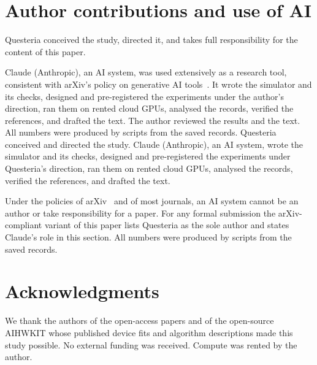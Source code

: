 \begin{sloppypar}
\end{sloppypar}

\section*{Author contributions and use of AI}
\ifdefined\arxivvariant
Questeria conceived the study, directed it, and takes full responsibility for the content of this paper.

Claude (Anthropic), an AI system, was used extensively as a research tool, consistent with arXiv's policy on generative AI
tools~\cite{arxiv_policy}. It wrote the simulator and its checks, designed and pre-registered the experiments under the
author's direction, ran them on rented cloud GPUs, analysed the records, verified the references, and drafted the text. The
author reviewed the results and the text. All numbers were produced by scripts from the saved records.
\else
Questeria conceived and directed the study. Claude (Anthropic), an AI system, wrote the simulator and its checks, designed and
pre-registered the experiments under Questeria's direction, ran them on rented cloud GPUs, analysed the records, verified the
references, and drafted the text.

Under the policies of arXiv~\cite{arxiv_policy} and of most journals, an AI system cannot be an author or take responsibility
for a paper. For any formal submission the arXiv-compliant variant of this paper lists Questeria as the sole author and states
Claude's role in this section. All numbers were produced by scripts from the saved records.
\fi

\section*{Acknowledgments}
We thank the authors of the open-access papers and of the open-source AIHWKIT whose published device fits and algorithm
descriptions made this study possible. No external funding was received. Compute was rented by the author.




\appendix






